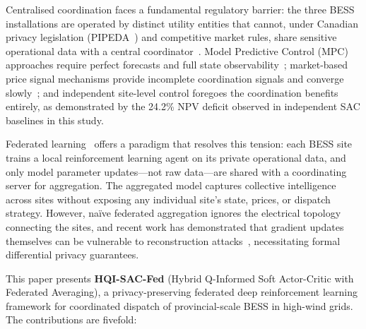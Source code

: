 \documentclass[journal]{IEEEtran}
\begin{document}
Centralised coordination faces a fundamental regulatory barrier: the
three BESS installations are operated by distinct utility entities that
cannot, under Canadian privacy legislation (PIPEDA~\cite{pipeda2000})
and competitive market rules, share sensitive operational data with a
central coordinator~\cite{arnoldMPC2016}. Model Predictive Control
(MPC) approaches require perfect forecasts and full state
observability~\cite{conejo2010}; market-based price signal mechanisms
provide incomplete coordination signals and converge slowly~\cite{cao2020rl};
and independent site-level control foregoes the coordination benefits
entirely, as demonstrated by the 24.2\% NPV deficit observed in
independent SAC baselines in this study.

Federated learning~\cite{mcmahan2017} offers a paradigm that resolves
this tension: each BESS site trains a local reinforcement learning
agent on its private operational data, and only model parameter
updates---not raw data---are shared with a coordinating server for
aggregation. The aggregated model captures collective intelligence
across sites without exposing any individual site's state, prices, or
dispatch strategy. However, naïve federated aggregation ignores the
electrical topology connecting the sites, and recent work has
demonstrated that gradient updates themselves can be vulnerable to
reconstruction attacks~\cite{zhu2019deep}, necessitating formal
differential privacy guarantees.

This paper presents \textbf{HQI-SAC-Fed} (Hybrid Q-Informed Soft
Actor-Critic with Federated Averaging), a privacy-preserving federated
deep reinforcement learning framework for coordinated dispatch of
provincial-scale BESS in high-wind grids. The contributions are fivefold:
\end{document}
